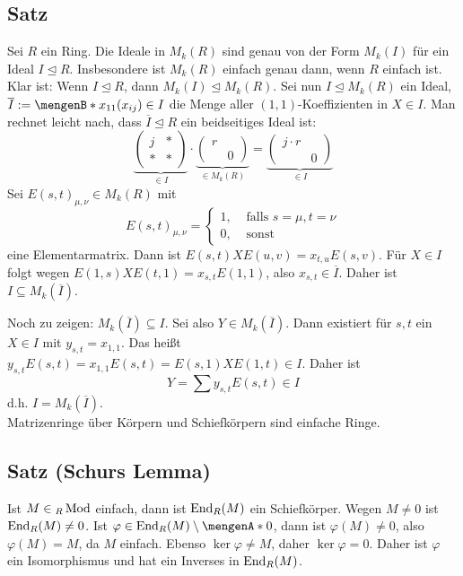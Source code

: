 \subsection[Satz über Ideale einen Ringes $R$ und Ideale in $M_k(R)$]{Satz} %
\label{sub:225}
Sei $R$ ein Ring. Die Ideale in $M_k(R)$ sind genau von der Form $M_k(I)$ für ein Ideal $I \unlhd R$. Insbesondere ist $M_k(R)$ einfach genau dann, wenn $R$ einfach ist.
Klar ist: Wenn $I \unlhd R$, dann $M_k(I) \unlhd M_k(R)$. Sei nun $I \unlhd M_k(R)$ ein Ideal, $\overline{I} := \set[x_{11}]{(x_{ij}) \in I}$ die Menge aller 
$(1,1)$-Koeffizienten in $X \in I$. Man rechnet leicht nach, dass $\overline{I} \unlhd R $ ein beidseitiges Ideal ist:
\[
	\underbrace{\begin{pmatrix}
		j & * \\
		* & *
	\end{pmatrix}}_{\in I} \cdot \underbrace{\begin{pmatrix}
		r & \\
		 & 0
	\end{pmatrix}}_{\in M_k(R)} = \underbrace{\begin{pmatrix}
		j \cdot r & \\
		& 0
	\end{pmatrix}}_{\in I}
\]
Sei $E(s,t)_{\mu, \nu} \in M_k(R)$ mit 
\[
	E(s,t)_{\mu, \nu} = \begin{cases}
		1, &\text{ falls }s= \mu, t= \nu \\
		0, &\text{ sonst }
	\end{cases}
\]
eine Elementarmatrix. Dann ist $E(s,t) X E(u,v) = x_{t,u} E(s,v)$. Für $X \in I$ folgt wegen $E(1,s) X E(t,1) = x_{s,t} E(1,1)$, also $x_{s,t} \in \overline{I}$. Daher ist
$I \subseteq M_k(\overline{I})$.

Noch zu zeigen: $M_k(\overline{I}) \subseteq I$. Sei also $Y \in M_k(\overline{I})$. Dann existiert für $s,t$ ein $X \in I$ mit $y_{s,t} = x_{1,1}$. Das heißt 
$y_{s,t} E(s,t) = x_{1,1} E(s,t) = E(s,1) X E(1,t) \in I$. Daher ist 
\[
	Y = \sum y_{s,t} E(s,t) \in I
\]
d.h. $I= M_k(\overline{I} )$. \bewende\\
Matrizenringe über Körpern und Schiefkörpern sind einfache Ringe.

\subsection{Satz (Schurs Lemma)} %
\label{sub:226}
Ist $M \in {_R \operatorname{Mod}}$ einfach, dann ist $\operatorname{End}_R(M)$ ein Schiefkörper.
Wegen $M \not= 0$ ist $\operatorname{End}_R(M) \not= 0$. Ist $\varphi \in \End_R(M) \setminus \set{0}$, dann ist $\varphi(M) \not= 0$, also $\varphi(M)=M$, da $M$ einfach. Ebenso
$\ker \varphi \not= M$, daher $\ker \varphi = 0$. Daher ist $\varphi$ ein Isomorphismus und hat ein Inverses in $\operatorname{End}_R(M)$. \bewende 

